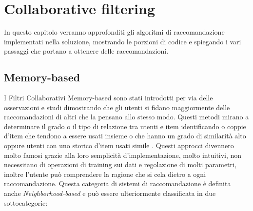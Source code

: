 \chapter{Collaborative filtering}\label{chp:03-recommendationSystems}
In questo capitolo verranno approfonditi gli algoritmi di raccomandazione implementati nella soluzione, mostrando le porzioni di 
codice e spiegando i vari passaggi che portano a ottenere delle raccomandazioni.
%
\section{Memory-based}
I Filtri Collaborativi Memory-based sono stati introdotti per via delle osservazioni e studi dimostrando che 
gli utenti si fidano maggiormente delle raccomandazioni di altri che la pensano allo stesso modo. Questi metodi mirano a determinare 
il grado o il tipo di relazione tra utenti e item identificando o coppie d'item che tendono a essere usati insieme 
o che hanno un grado di similarità alto oppure utenti con uno storico d'item usati simile \cite{taxonomy-of-recommender-agents-on-the-internet}.
Questi approcci divennero molto famosi grazie alla loro semplicità d'implementazione, molto intuitivi, non necessitano di operazioni 
di training sui dati e regolazione di molti parametri, inoltre l'utente può comprendere la ragione che si cela dietro 
a ogni raccomandazione.\hfill\break
Questa categoria di sistemi di raccomandazione è definita anche \textit{Neighborhood-based} e può essere ulteriormente 
classificata in due sottocategorie:
%
